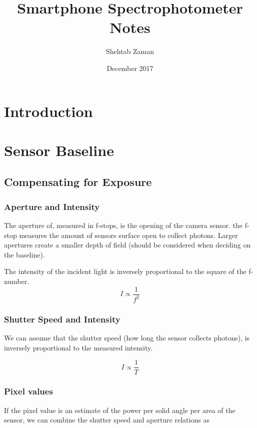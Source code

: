 \documentclass{article}
\title{Smartphone Spectrophotometer Notes}
\author{Shehtab Zaman }
\date{December 2017}
\begin{document}
\maketitle
\section{Introduction}

\section{Sensor Baseline}

\subsection{Compensating for Exposure}

\subsubsection{Aperture and Intensity}

The aperture of, measured in f-stops, is the opening of the camera sensor. the
f-stop measures the amount of sensors surface open to collect photons. Larger
apertures create a smaller depth of field (should be considered when deciding on the baseline).

The intensity of the incident light is inversely proportional to the square of the
f-number.
$$ I \propto \frac{1}{f^2} $$

\subsubsection{Shutter Speed and Intensity}
We can assume that the shutter speed (how long the sensor collects photons), is inversely proportional
to the measured intensity.

$$ I \propto \frac{1}{T}$$

\subsubsection{Pixel values}

If the pixel value is an estimate of the power per solid angle per area of the sensor, we can combine the
shutter speed and aperture relations as
\end{document}
